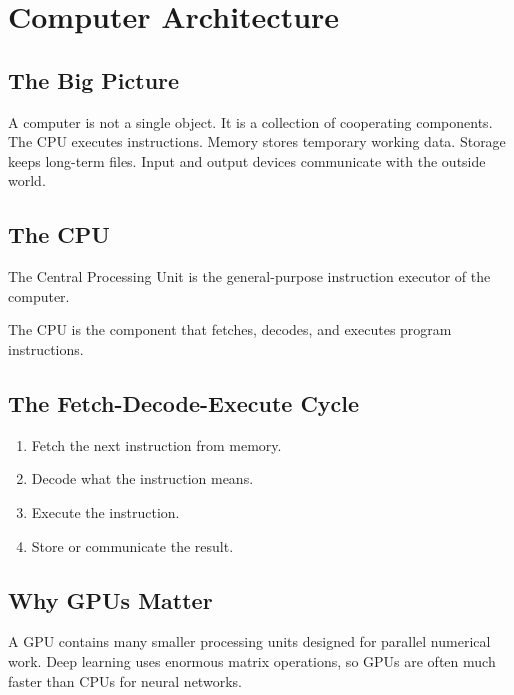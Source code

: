 
\chapter{Computer Architecture}
\label{chap:computer-architecture}


\section{The Big Picture}
A computer is not a single object. It is a collection of cooperating components. The CPU executes instructions. Memory stores temporary working data. Storage keeps long-term files. Input and output devices communicate with the outside world.

\section{The CPU}
The Central Processing Unit is the general-purpose instruction executor of the computer.
\begin{definition}The CPU is the component that fetches, decodes, and executes program instructions.\end{definition}

\section{The Fetch-Decode-Execute Cycle}
\begin{enumerate}\item Fetch the next instruction from memory.\item Decode what the instruction means.\item Execute the instruction.\item Store or communicate the result.\end{enumerate}

\section{Why GPUs Matter}
A GPU contains many smaller processing units designed for parallel numerical work. Deep learning uses enormous matrix operations, so GPUs are often much faster than CPUs for neural networks.

